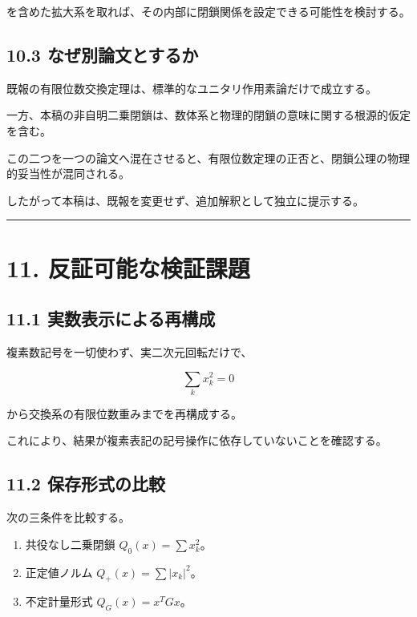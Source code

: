 \documentclass[
  a4paper,
  10pt]{article}
\providecommand{\tightlist}{%
  \setlength{\itemsep}{0pt}\setlength{\parskip}{0pt}}
\begin{document}
を含めた拡大系を取れば、その内部に閉鎖関係を設定できる可能性を検討する。

\subsection{10.3
なぜ別論文とするか}\label{103-ux306aux305cux5225ux8ad6ux6587ux3068ux3059ux308bux304b}

既報の有限位数交換定理は、標準的なユニタリ作用素論だけで成立する。

一方、本稿の非自明二乗閉鎖は、数体系と物理的閉鎖の意味に関する根源的仮定を含む。

この二つを一つの論文へ混在させると、有限位数定理の正否と、閉鎖公理の物理的妥当性が混同される。

したがって本稿は、既報を変更せず、追加解釈として独立に提示する。

\begin{center}\rule{0.5\linewidth}{0.5pt}\end{center}

\section{11.
反証可能な検証課題}\label{11-ux53cdux8a3cux53efux80fdux306aux691cux8a3cux8ab2ux984c}

\subsection{11.1
実数表示による再構成}\label{111-ux5b9fux6570ux8868ux793aux306bux3088ux308bux518dux69cbux6210}

複素数記号を一切使わず、実二次元回転だけで、

\[
\sum_kx_k^2=0
\]

から交換系の有限位数重みまでを再構成する。

これにより、結果が複素表記の記号操作に依存していないことを確認する。

\subsection{11.2
保存形式の比較}\label{112-ux4fddux5b58ux5f62ux5f0fux306eux6bd4ux8f03}

次の三条件を比較する。

\begin{enumerate}
\def\labelenumi{\arabic{enumi}.}
\tightlist
\item
  共役なし二乗閉鎖 \(Q_0(x)=\sum x_k^2\)。
\item
  正定値ノルム \(Q_+(x)=\sum|x_k|^2\)。
\item
  不定計量形式 \(Q_G(x)=x^TGx\)。
\end{enumerate}
\end{document}
